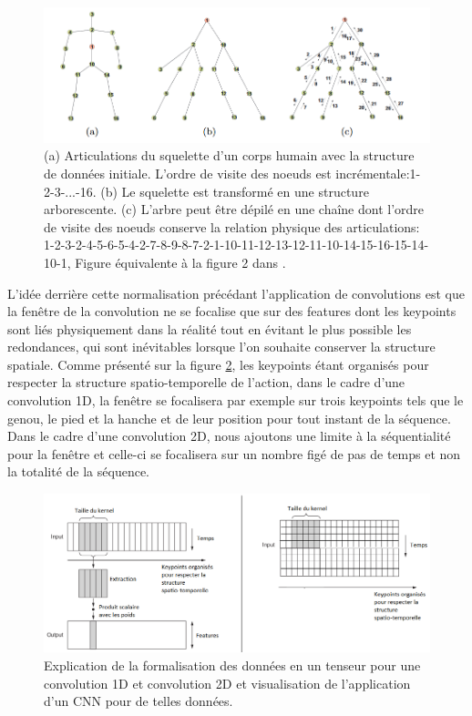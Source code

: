 \begin{figure}[H]
    \centering
    \includegraphics[width=1\linewidth]{Images/DFS.png}
    \caption{(a) Articulations du squelette d'un corps humain avec la structure de données initiale. L'ordre de visite des noeuds est incrémentale:1-2-3-...-16. (b) Le squelette est transformé en une structure arborescente. (c)  L'arbre peut être dépilé en une chaîne dont l'ordre de visite des noeuds conserve la relation physique des articulations: 1-2-3-2-4-5-6-5-4-2-7-8-9-8-7-2-1-10-11-12-13-12-11-10-14-15-16-15-14-10-1, Figure équivalente à la figure 2 dans  \cite{liu2016spatio}.}
    \label{fig:DFS}
\end{figure}


L'idée derrière cette normalisation précédant l'application de convolutions est que la fenêtre de la convolution ne se focalise que  sur des features dont les keypoints sont liés physiquement dans la réalité tout en évitant le plus possible les redondances, qui sont  inévitables lorsque l’on souhaite conserver la structure spatiale. Comme présenté sur la figure \ref{fig:explanationCNN}, les keypoints étant organisés pour respecter la structure spatio-temporelle de l'action, dans le cadre d'une convolution 1D, la fenêtre se focalisera par exemple sur trois keypoints tels que le genou, le pied et la hanche et de leur position pour tout instant de la séquence. Dans le cadre d'une convolution 2D, nous ajoutons une limite à la séquentialité pour la fenêtre et celle-ci se focalisera sur un nombre figé de pas de temps et non la totalité de la séquence.



\begin{figure}[H]
    \centering
    \includegraphics[width=0.95\linewidth]{Images/explanation_cnn_dfs.png}
    \caption{Explication de la formalisation des données en un tenseur pour une convolution 1D et convolution 2D et visualisation de l'application d'un CNN pour de telles données.}
    \label{fig:explanationCNN}
\end{figure}

